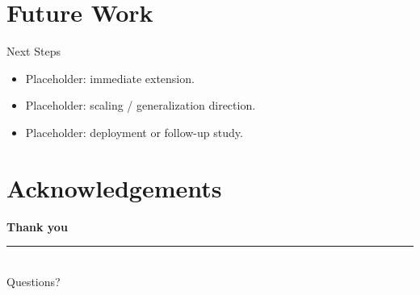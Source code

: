 \section{Future Work}

\begin{frame}{Next Steps}
  \begin{itemize}\setlength{\itemsep}{0.9em}
    \item Placeholder: immediate extension.
    \item Placeholder: scaling / generalization direction.
    \item Placeholder: deployment or follow-up study.
  \end{itemize}
\end{frame}

\section*{Acknowledgements}

{%
  \begin{frame}
    \vfill
    \centering
    {\Raleway\bfseries\Huge\color{white} Thank you}\\[0.6em]
    {\color{aggiegold}\rule{4cm}{0.06cm}}\\[0.8em]
    {\Lato\large\color{white} Questions?}
    \vfill
  \end{frame}
}


